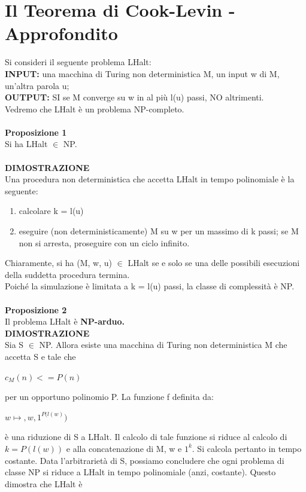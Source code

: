 \section{Il Teorema di Cook-Levin - Approfondito}
Si consideri il seguente problema LHalt:\\
\textbf{INPUT:} una macchina di Turing non deterministica M, un input w di M, un’altra parola u;\\
\textbf{OUTPUT:} SI se M converge su w in al più l(u) passi, NO altrimenti.\\
Vedremo che LHalt è un problema NP-completo.\\\\
\textbf{Proposizione 1}\\ 
Si ha LHalt $\in$ NP.\\\\
\textbf{DIMOSTRAZIONE}\\ 
Una procedura non deterministica che accetta LHalt in tempo polinomiale è la seguente:
\begin{enumerate}
    \item calcolare k = l(u)
    \item eseguire (non deterministicamente) M su w per un massimo di k passi; se M non si arresta, proseguire con un ciclo infinito.
\end{enumerate}
Chiaramente, si ha (M, w, u) $\in$ LHalt se e solo se una delle possibili esecuzioni della suddetta procedura termina. \\Poiché la simulazione è limitata a k = l(u) passi, la classe di complessità è NP.\\
\\\textbf{Proposizione 2}
\\Il problema LHalt è \textbf{NP-arduo.}
\\\textbf{DIMOSTRAZIONE} 
\\Sia S $\in$ NP. Allora esiste una macchina di Turing non deterministica M che accetta S e tale che 
\begin{center}
    $c_M(n) <= P(n)$
\end{center}
per un opportuno polinomio P. La funzione f definita da:
\begin{center}
    $w  \mapsto , w, 1^{P(l(w)})$
\end{center}
è una riduzione di S a LHalt. Il calcolo di tale funzione si riduce al calcolo di $k = P(l(w))$ e alla concatenazione di M, w e $1^k$. Si calcola pertanto in tempo costante. Data l’arbitrarietà di S, possiamo concludere che ogni problema di classe NP si riduce a LHalt in tempo polinomiale (anzi, costante). Questo dimostra che LHalt è
